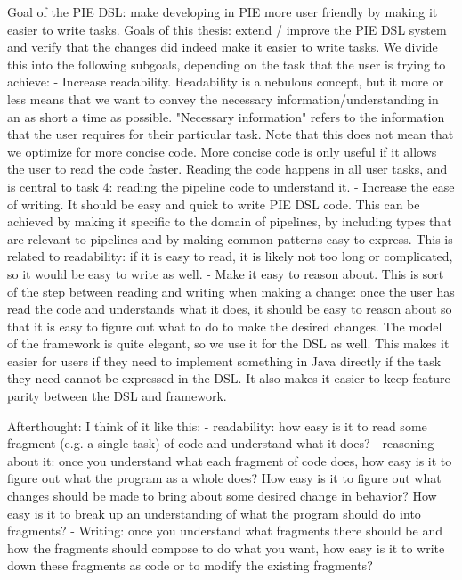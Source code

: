 Goal of the PIE DSL: make developing in PIE more user friendly by making it easier to write tasks.
Goals of this thesis: extend / improve the PIE DSL system and verify that the changes did indeed make it easier to write tasks.
We divide this into the following subgoals, depending on the task that the user is trying to achieve:
- Increase readability. Readability is a nebulous concept, but it more or less means that we want to convey the necessary information/understanding in an as short a time as possible. "Necessary information" refers to the information that the user requires for their particular task.
Note that this does not mean that we optimize for more concise code. More concise code is only useful if it allows the user to read the code faster.
Reading the code happens in all user tasks, and is central to task 4: reading the pipeline code to understand it.
- Increase the ease of writing. It should be easy and quick to write PIE DSL code.
This can be achieved by making it specific to the domain of pipelines, by including types that are relevant to pipelines and by making common patterns easy to express.
This is related to readability: if it is easy to read, it is likely not too long or complicated, so it would be easy to write as well.
- Make it easy to reason about. This is sort of the step between reading and writing when making a change: once the user has read the code and understands what it does, it should be easy to reason about so that it is easy to figure out what to do to make the desired changes.
The model of the framework is quite elegant, so we use it for the DSL as well.
This makes it easier for users if they need to implement something in Java directly if the task they need cannot be expressed in the DSL.
It also makes it easier to keep feature parity between the DSL and framework.


Afterthought: I think of it like this:
- readability: how easy is it to read some fragment (e.g. a single task) of code and understand what it does?
- reasoning about it: once you understand what each fragment of code does, how easy is it to figure out what the program as a whole does? How easy is it to figure out what changes should be made to bring about some desired change in behavior? How easy is it to break up an understanding of what the program should do into fragments?
- Writing: once you understand what fragments there should be and how the fragments should compose to do what you want, how easy is it to write down these fragments as code or to modify the existing fragments?

